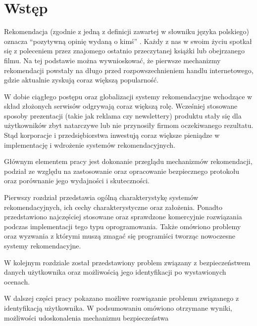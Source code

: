 
\chapter{Wstęp}

\indent Rekomendacja (zgodnie z jedną z definicji zawartej w słowniku języka polskiego) oznacza “pozytywną opinię wydaną o kimś” \cite{pwn}. Każdy z nas w swoim życiu spotkał się z poleceniem przez znajomego ostatnio przeczytanej książki lub obejrzanego filmu. Na tej podstawie można wywnioskować, że pierwsze mechanizmy rekomendacji powstały na długo przed rozpowszechnieniem handlu internetowego, gdzie aktualnie zyskują coraz większą popularność.

\indent W dobie ciągłego postępu oraz globalizacji systemy rekomendacyjne wchodzące w skład złożonych serwisów odgrywają coraz większą rolę. Wcześniej stosowane sposoby prezentacji (takie jak reklama czy newslettery) produktu stały się dla użytkowników zbyt natarczywe lub nie przynosiły firmom oczekiwanego rezultatu. Stąd korporacje i przedsiębiorstwa inwestują coraz większe pieniądze w implementację i wdrożenie systemów rekomendacyjnych.

\indent Głównym elementem pracy jest dokonanie przeglądu mechanizmów rekomendacji, podział ze względu na zastosowanie oraz opracowanie bezpiecznego protokołu oraz porównanie jego wydajności i skuteczności.

\indent Pierwszy rozdział przedstawia ogólną charakterystykę systemów rekomendacyjnych, ich cechy charakterystyczne oraz założenia. Ponadto przedstawiono najczęściej stosowane oraz sprawdzone komercyjnie rozwiązania podczas implementacji tego typu oprogramowania. Także omówiono problemy oraz wyzwania z którymi muszą zmagać się programiści tworząc nowoczesne systemy rekomendacyjne.  

\indent W kolejnym rozdziale został przedstawiony problem związany z bezpieczeństwem danych użytkownika oraz możliwością jego identyfikacji po wystawionych ocenach.

\indent W dalszej części pracy pokazano możliwe rozwiązanie problemu związanego z identyfikacją użytkownika.
W podsumowaniu omówiono otrzymane wyniki, możliwości udoskonalenia mechanizmu bezpieczeństwa 


